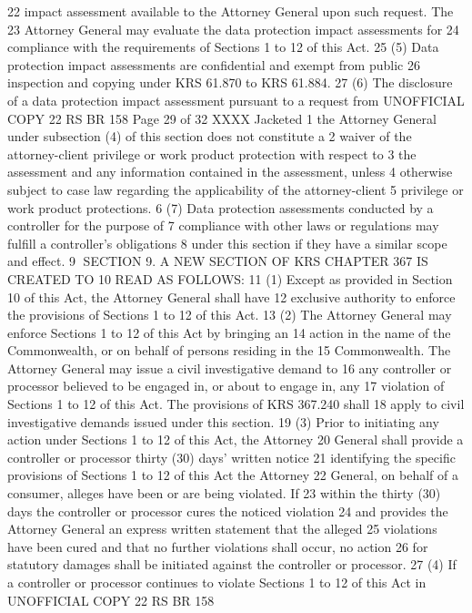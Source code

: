 22 impact assessment available to the Attorney General upon such request. The
23 Attorney General may evaluate the data protection impact assessments for
24 compliance with the requirements of Sections 1 to 12 of this Act.
25 (5) Data protection impact assessments are confidential and exempt from public
26 inspection and copying under KRS 61.870 to KRS 61.884.
27 (6) The disclosure of a data protection impact assessment pursuant to a request from 
UNOFFICIAL COPY 22 RS BR 158
Page 29 of 32
XXXX Jacketed
1 the Attorney General under subsection (4) of this section does not constitute a
2 waiver of the attorney-client privilege or work product protection with respect to
3 the assessment and any information contained in the assessment, unless
4 otherwise subject to case law regarding the applicability of the attorney-client
5 privilege or work product protections.
6 (7) Data protection assessments conducted by a controller for the purpose of
7 compliance with other laws or regulations may fulfill a controller's obligations
8 under this section if they have a similar scope and effect.
9 SECTION 9. A NEW SECTION OF KRS CHAPTER 367 IS CREATED TO
10 READ AS FOLLOWS:
11 (1) Except as provided in Section 10 of this Act, the Attorney General shall have
12 exclusive authority to enforce the provisions of Sections 1 to 12 of this Act.
13 (2) The Attorney General may enforce Sections 1 to 12 of this Act by bringing an
14 action in the name of the Commonwealth, or on behalf of persons residing in the
15 Commonwealth. The Attorney General may issue a civil investigative demand to
16 any controller or processor believed to be engaged in, or about to engage in, any
17 violation of Sections 1 to 12 of this Act. The provisions of KRS 367.240 shall
18 apply to civil investigative demands issued under this section.
19 (3) Prior to initiating any action under Sections 1 to 12 of this Act, the Attorney
20 General shall provide a controller or processor thirty (30) days' written notice
21 identifying the specific provisions of Sections 1 to 12 of this Act the Attorney
22 General, on behalf of a consumer, alleges have been or are being violated. If
23 within the thirty (30) days the controller or processor cures the noticed violation
24 and provides the Attorney General an express written statement that the alleged
25 violations have been cured and that no further violations shall occur, no action
26 for statutory damages shall be initiated against the controller or processor.
27 (4) If a controller or processor continues to violate Sections 1 to 12 of this Act in 
UNOFFICIAL COPY 22 RS BR 158
